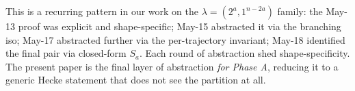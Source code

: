 \documentclass[11pt]{article}
\theoremstyle{definition}
\begin{document}
This is a recurring pattern in our work on the
$\lambda = (2^a, 1^{n-2a})$ family: the May-13 proof was explicit
and shape-specific; May-15 abstracted it via the branching iso;
May-17 abstracted further via the per-trajectory invariant; May-18
identified the final pair via closed-form $S_a$.  Each round of
abstraction shed shape-specificity.  The present paper is the
final layer of abstraction \emph{for Phase A}, reducing it to a
generic Hecke statement that does not see the partition at all.
\end{document}
